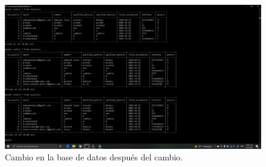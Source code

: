 \documentclass[11pt]{article}
\begin{document}
		\begin{figure}[H]
			\centering
			\includegraphics[scale=0.34]{resources/MOVIL2.png}
			\caption{Cambio en la base de datos después del cambio.}\label{fig:picture}
		\end{figure}
\end{document}
